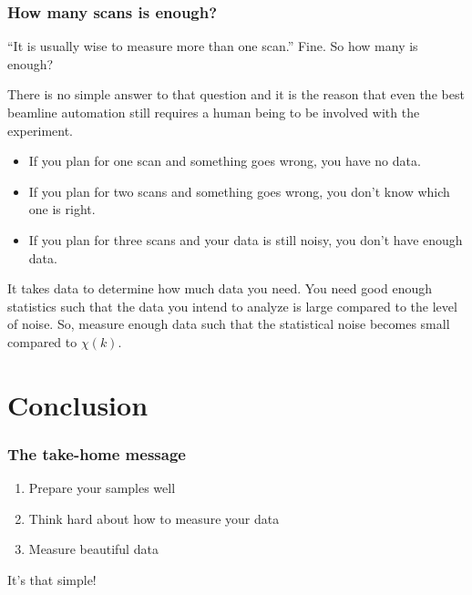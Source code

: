 \documentclass[10pt, xcolor=x11names, compress]{beamer}
\begin{document}
\begin{frame}
  \frametitle{How many scans is enough?}

  \begin{block}{``It is usually wise to measure more than one scan.''}
    Fine. So how many is enough?
  \end{block}

  \medskip

  There is no simple answer to that question and it is the reason that
  even the best beamline automation still requires a human being to be
  involved with the experiment.

  \medskip

  \begin{itemize}
  \item If you plan for \alert{one} scan and something goes wrong, you
    have no data.
  \item If you plan for \alert{two} scans and something goes wrong,
    you don't know which one is right.
  \item If you plan for \alert{three} scans and your data is still
    noisy, you don't have enough data.
  \end{itemize}

  \begin{exampleblock}{It takes data to determine how much data you need.}
    You need good enough statistics such that the data you
    intend to analyze is large compared to the level of noise.  So,
    measure enough data such that the statistical noise becomes small
    compared to $\chi(k)$.
  \end{exampleblock}

\end{frame}

\section{Conclusion}

\begin{frame}
  \frametitle{The take-home message}
  \begin{enumerate}
  \item Prepare your samples well
  \item Think hard about how to measure your data
  \item Measure beautiful data
  \end{enumerate}
  \begin{exampleblock}{}
    \centering It's that simple!
  \end{exampleblock}
\end{frame}
\end{document}
